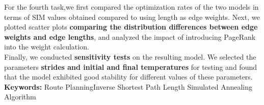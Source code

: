 \documentclass[12pt]{article}
\begin{document}
\indent For the fourth task,we first compared the optimization rates of the two models in terms of SIM values obtained compared to using length as edge weights. Next, we plotted scatter plots \textbf{comparing the distribution differences between edge weights and edge lengths}, and analyzed the impact of introducing PageRank into the weight calculation.\\
\indent Finally, we conducted \textbf{sensitivity tests} on the resulting model. We selected the parameters \textbf{strides and initial and final temperatures} for testing and found that the model exhibited good stability for different values of these parameters.\\
\vspace{0.4cm}
 \textbf{Keywords: }Route Planning\quad Inverse Shortest Path Length \quad Simulated Annealing Algorithm

\clearpage
\pagestyle{fancy}
\newpage
\setcounter{page}{2}

\tableofcontents
\newpage











\end{document}
